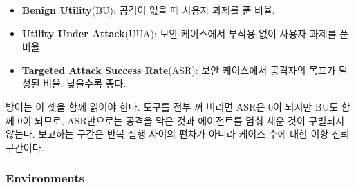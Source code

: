 \documentclass[acmsmall,screen,review,anonymous]{acmart}
\begin{document}
\begin{itemize}
    \item \textbf{Benign Utility}(BU): 공격이 없을 때 사용자 과제를 푼 비율.
    \item \textbf{Utility Under Attack}(UUA): 보안 케이스에서 부작용 없이 사용자 과제를 푼 비율.
    \item \textbf{Targeted Attack Success Rate}(ASR): 보안 케이스에서 공격자의 목표가 달성된 비율. 낮을수록 좋다.
\end{itemize}

방어는 이 셋을 함께 읽어야 한다. 도구를 전부 꺼 버리면 ASR은 0이 되지만 BU도 함께 0이 되므로, ASR만으로는 공격을 막은 것과 에이전트를 멈춰 세운 것이 구별되지 않는다. 보고하는 구간은 반복 실행 사이의 편차가 아니라 케이스 수에 대한 이항 신뢰구간이다.

\subsubsection{Environments}
\end{document}
